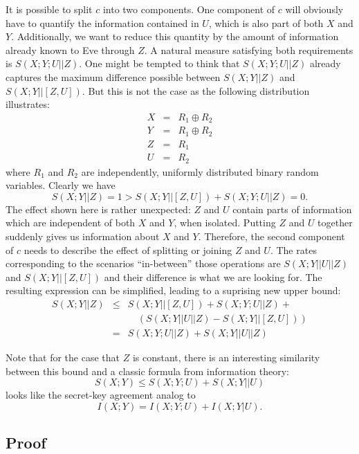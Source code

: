 \documentclass[a4paper, twoside, openany]{report}
\newcommand{\srate}{S(X;Y||Z)}
\theoremstyle{plain}
\theoremstyle{definition}
\begin{document}
It is possible to split $c$ into two components. One component of $c$ will obviously have to quantify the information contained in $U$, which is also part of both $X$ and $Y$. Additionally, we want to reduce this quantity by the amount of information already known to Eve through $Z$. A natural measure satisfying both requirements is $S(X;Y;U||Z)$. One might be tempted to think that $S(X;Y;U||Z)$ already captures the maximum difference possible between $S(X;Y||Z)$ and $S(X;Y||[Z,U])$. But this is not the case as the following distribution illustrates:
\begin{eqnarray*}
X & = & R_1 \oplus R_2 \\
Y & = & R_1 \oplus R_2 \\
Z & = & R_1 \\
U & = & R_2
\end{eqnarray*}
where $R_1$ and $R_2$ are independently, uniformly distributed binary random variables. Clearly we have
\[\srate = 1 > S(X;Y||[Z,U]) + S(X;Y;U||Z) = 0.\]
The effect shown here is rather unexpected: $Z$ and $U$ contain parts of information which are independent of both $X$ and $Y$, when isolated. Putting $Z$ and $U$ together suddenly gives us information about $X$ and $Y$. Therefore, the second component of $c$ needs to describe the effect of splitting or joining $Z$ and $U$. The rates corresponding to the scenarios ``in-between'' those operations are $S(X;Y||U||Z)$ and $S(X;Y||[Z,U])$ and their difference is what we are looking for. The resulting expression can be simplified, leading to a suprising new upper bound:
\begin{eqnarray} \label{eq:newUbnd}
\srate & \leq & S(X;Y||[Z,U]) + S(X;Y;U||Z) + \nonumber \\
       &      & \quad (S(X;Y||U||Z) - S(X;Y||[Z,U])) \nonumber \\
       &  =   & S(X;Y;U||Z) + S(X;Y||U||Z)
\end{eqnarray}

Note that for the case that $Z$ is constant, there is an interesting similarity between this bound and a classic formula from information theory:
\[S(X;Y) \leq S(X;Y;U) + S(X;Y||U)\]
looks like the secret-key agreement analog to
\[I(X;Y) = I(X;Y;U) + I(X;Y|U).\]


\subsection{Proof}
\end{document}
